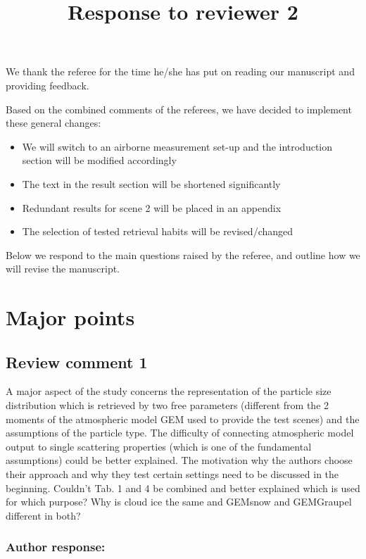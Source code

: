 \documentclass[11pt]{scrartcl}
\author{}
\date{}
\title{Response to reviewer 2}
\begin{document}
\maketitle

\setlength{\parindent}{0cm}

We thank the referee for the time he/she has put on reading our manuscript and providing
feedback.

Based on the combined comments of the referees, we have decided to implement these general
changes:

\begin{itemize}
\item We will switch to an airborne measurement set-up and
  the introduction section will be modified accordingly
\item The text in the result section will be shortened significantly
\item Redundant results for scene 2 will be placed in an appendix
\item The selection of tested retrieval habits will be revised/changed
\end{itemize}

Below we respond to the main questions raised by the referee, and outline how we will
revise the manuscript.


\section{Major points}

\subsection*{Review comment 1}

A major aspect of the study concerns the representation of the particle size
distribution which is retrieved by two free parameters (different from the 2
moments of the atmospheric model GEM used to provide the test scenes) and the
assumptions of the particle type. The difficulty of connecting atmospheric model
output to single scattering properties (which is one of the fundamental
assumptions) could be better explained. The motivation why the authors choose
their approach and why they test certain settings need to be discussed in the
beginning. Couldn’t Tab. 1 and 4 be combined and better explained which is used
for which purpose? Why is cloud ice the same and GEMsnow and GEMGraupel different
in both?

\subsubsection*{Author response:}
\end{document}
